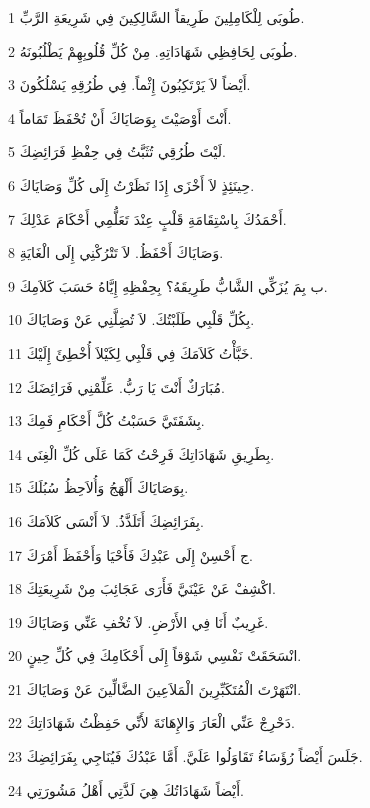 \par 1 طُوبَى لِلْكَامِلِينَ طَرِيقاً السَّالِكِينَ فِي شَرِيعَةِ الرَّبِّ.
\par 2 طُوبَى لِحَافِظِي شَهَادَاتِهِ. مِنْ كُلِّ قُلُوبِهِمْ يَطْلُبُونَهُ.
\par 3 أَيْضاً لاَ يَرْتَكِبُونَ إِثْماً. فِي طُرُقِهِ يَسْلُكُونَ.
\par 4 أَنْتَ أَوْصَيْتَ بِوَصَايَاكَ أَنْ تُحْفَظَ تَمَاماً.
\par 5 لَيْتَ طُرُقِي تُثَبَّتُ فِي حِفْظِ فَرَائِضِكَ.
\par 6 حِينَئِذٍ لاَ أَخْزَى إِذَا نَظَرْتُ إِلَى كُلِّ وَصَايَاكَ.
\par 7 أَحْمَدُكَ بِاسْتِقَامَةِ قَلْبٍ عِنْدَ تَعَلُّمِي أَحْكَامَ عَدْلِكَ.
\par 8 وَصَايَاكَ أَحْفَظُ. لاَ تَتْرُكْنِي إِلَى الْغَايَةِ.
\par 9 ب بِمَ يُزَكِّي الشَّابُّ طَرِيقَهُ؟ بِحِفْظِهِ إِيَّاهُ حَسَبَ كَلاَمِكَ.
\par 10 بِكُلِّ قَلْبِي طَلَبْتُكَ. لاَ تُضِلَّنِي عَنْ وَصَايَاكَ.
\par 11 خَبَّأْتُ كَلاَمَكَ فِي قَلْبِي لِكَيْلاَ أُخْطِئَ إِلَيْكَ.
\par 12 مُبَارَكٌ أَنْتَ يَا رَبُّ. عَلِّمْنِي فَرَائِضَكَ.
\par 13 بِشَفَتَيَّ حَسَبْتُ كُلَّ أَحْكَامِ فَمِكَ.
\par 14 بِطَرِيقِ شَهَادَاتِكَ فَرِحْتُ كَمَا عَلَى كُلِّ الْغِنَى.
\par 15 بِوَصَايَاكَ أَلْهَجُ وَأُلاَحِظُ سُبُلَكَ.
\par 16 بِفَرَائِضِكَ أَتَلَذَّذُ. لاَ أَنْسَى كَلاَمَكَ.
\par 17 ج أَحْسِنْ إِلَى عَبْدِكَ فَأَحْيَا وَأَحْفَظَ أَمْرَكَ.
\par 18 اكْشِفْ عَنْ عَيْنَيَّ فَأَرَى عَجَائِبَ مِنْ شَرِيعَتِكَ.
\par 19 غَرِيبٌ أَنَا فِي الأَرْضِ. لاَ تُخْفِ عَنِّي وَصَايَاكَ.
\par 20 انْسَحَقَتْ نَفْسِي شَوْقاً إِلَى أَحْكَامِكَ فِي كُلِّ حِينٍ.
\par 21 انْتَهَرْتَ الْمُتَكَبِّرِينَ الْمَلاَعِينَ الضَّالِّينَ عَنْ وَصَايَاكَ.
\par 22 دَحْرِجْ عَنِّي الْعَارَ وَالإِهَانَةَ لأَنِّي حَفِظْتُ شَهَادَاتِكَ.
\par 23 جَلَسَ أَيْضاً رُؤَسَاءُ تَقَاوَلُوا عَلَيَّ. أَمَّا عَبْدُكَ فَيُنَاجِي بِفَرَائِضِكَ.
\par 24 أَيْضاً شَهَادَاتُكَ هِيَ لَذَّتِي أَهْلُ مَشُورَتِي.
